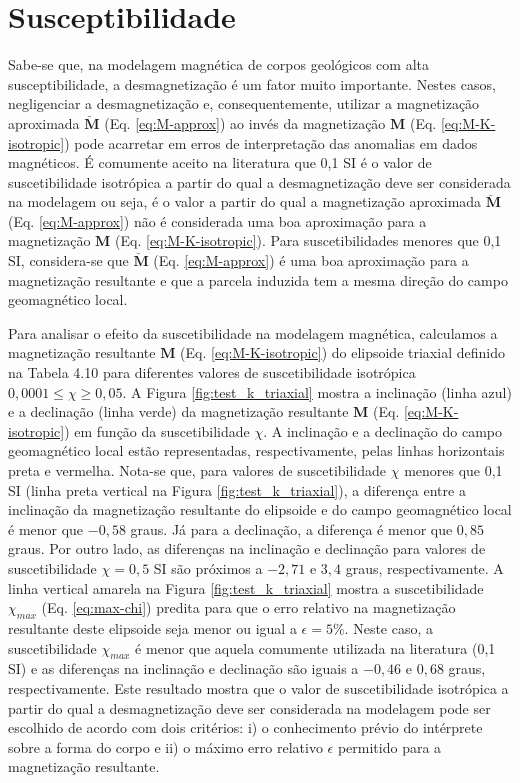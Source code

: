 \section{Susceptibilidade}

Sabe-se que, na modelagem magnética de corpos geológicos com alta susceptibilidade, a desmagnetização é um fator muito importante. Nestes casos, negligenciar a desmagnetização e, consequentemente, utilizar a magnetização aproximada $\breve{\mathbf{M}}$ (Eq. \ref{eq:M-approx}) ao invés da magnetização $\mathbf{M}$ (Eq. \ref{eq:M-K-isotropic}) pode acarretar em erros de interpretação das anomalias em dados magnéticos. É comumente aceito na literatura que 0,1 SI é o valor de suscetibilidade isotrópica a partir do qual a desmagnetização deve ser considerada na modelagem ou seja, é o valor a partir do qual a magnetização aproximada $\breve{\mathbf{M}}$ (Eq. \ref{eq:M-approx}) não é considerada uma boa aproximação para a magnetização $\mathbf{M}$ (Eq. \ref{eq:M-K-isotropic}). Para suscetibilidades menores que 0,1 SI, considera-se que $\breve{\mathbf{M}}$ (Eq. \ref{eq:M-approx}) é uma boa aproximação para a magnetização resultante e que a parcela induzida tem a mesma direção do campo geomagnético local.

Para analisar o efeito da suscetibilidade na modelagem magnética, calculamos a magnetização resultante $\mathbf{M}$ (Eq. \ref{eq:M-K-isotropic}) do elipsoide triaxial definido na Tabela 4.10 para diferentes valores de suscetibilidade isotrópica $0,0001 \le \chi \ge 0,05$. A Figura \ref{fig:test_k_triaxial} mostra a inclinação (linha azul) e a declinação (linha verde) da magnetização resultante $\mathbf{M}$ (Eq. \ref{eq:M-K-isotropic}) em função da suscetibilidade $\chi$. A inclinação e a declinação do campo geomagnético local estão representadas, respectivamente, pelas linhas horizontais preta e vermelha. Nota-se que, para valores de suscetibilidade $\chi$ menores que 0,1 SI (linha preta vertical na Figura \ref{fig:test_k_triaxial}), a diferença entre a inclinação da magnetização resultante do elipsoide e do campo geomagnético local é menor que $-0,58$ graus. Já para a declinação, a diferença é menor que $0,85$ graus. Por outro lado, as diferenças na inclinação e declinação para valores de suscetibilidade $\chi = 0,5$ SI são próximos a $-2,71$ e $3,4$ graus, respectivamente. A linha vertical amarela na Figura \ref{fig:test_k_triaxial} mostra a suscetibilidade $\chi_{max}$ (Eq. \ref{eq:max-chi}) predita para que o erro relativo na magnetização resultante deste elipsoide seja menor ou igual a $\epsilon = 5 \%$. Neste caso, a suscetibilidade $\chi_{max}$ é menor que aquela comumente utilizada na literatura (0,1 SI) e as diferenças na inclinação e declinação são iguais a $-0,46$ e $0,68$ graus, respectivamente. Este resultado mostra que o valor de suscetibilidade isotrópica a partir do qual a desmagnetização deve ser considerada na modelagem pode ser escolhido de acordo com dois critérios: i) o conhecimento prévio do intérprete sobre a forma do corpo e ii) o máximo erro relativo $\epsilon$ permitido para a magnetização resultante.


